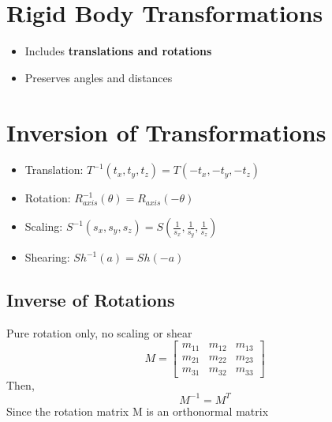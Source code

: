 \documentclass{article}
\begin{document}
\section*{Rigid Body Transformations}
\begin{itemize}
    \item Includes \textbf{translations and rotations}
    \item Preserves angles and distances
\end{itemize}

\section*{Inversion of Transformations}
\begin{itemize}
    \item Translation: $T^{-1}(t_x, t_y, t_z) = T(-t_x, -t_y, -t_z)$
    \item Rotation: $R^{-1}_{axis}(\theta) = R_{axis}(-\theta)$
    \item Scaling: $S^{-1}(s_x, s_y, s_z) = S(\frac{1}{s_x}, \frac{1}{s_y}, \frac{1}{s_z})$
    \item Shearing: $Sh^{-1}(a) = Sh(-a)$
\end{itemize}

\subsection*{Inverse of Rotations}
Pure rotation only, no scaling or shear
\[M = \begin{bmatrix}
    m_{11} & m_{12} & m_{13} \\
    m_{21} & m_{22} & m_{23} \\
    m_{31} & m_{32} & m_{33}
\end{bmatrix}\]
Then,
\[M^{-1} = M^T\]
Since the rotation matrix M is an orthonormal matrix
\end{document}
